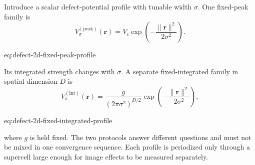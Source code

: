 Introduce a scalar defect-potential profile with tunable width $\sigma$. One
fixed-peak family is
\begin{equation}
    V_{\sigma}^{(\mathrm{peak})}(\mathbf r)
    =
    V_c
    \exp\left(
        -\frac{\lVert\mathbf r\rVert^2}{2\sigma^2}
    \right).
    \label{eq:defect-2d-fixed-peak-profile}
\end{equation}
\begin{equationterms}{eq:defect-2d-fixed-peak-profile}
\end{equationterms}
Its integrated strength changes with $\sigma$. A separate fixed-integrated
family in spatial dimension $D$ is
\begin{equation}
    V_{\sigma}^{(\mathrm{int})}(\mathbf r)
    =
    \frac{g}{(2\pi\sigma^2)^{D/2}}
    \exp\left(
        -\frac{\lVert\mathbf r\rVert^2}{2\sigma^2}
    \right),
    \label{eq:defect-2d-fixed-integrated-profile}
\end{equation}
\begin{equationterms}{eq:defect-2d-fixed-integrated-profile}
\end{equationterms}
where $g$ is held fixed. The two protocols answer different questions and must
not be mixed in one convergence sequence. Each profile is periodized only
through a supercell large enough for image effects to be measured separately.

